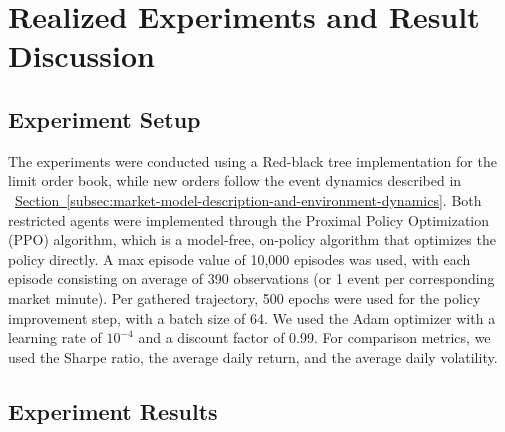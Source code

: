 \section{Realized Experiments and Result Discussion}
\label{sec:realized-experiments-and-result-discussion}

\subsection{Experiment Setup}
\label{subsec:experiment-setup}

The experiments were conducted using a Red-black tree implementation for the limit order book, while new orders follow the event dynamics described in
~\hyperref[subsec:market-model-description-and-environment-dynamics]{Section~\ref*{subsec:market-model-description-and-environment-dynamics}}.
Both restricted agents were implemented through the Proximal Policy Optimization (PPO) algorithm, which is a model-free, on-policy algorithm that optimizes the policy directly.
A max episode value of 10,000 episodes was used, with each episode consisting on average of 390 observations (or 1 event per corresponding market minute).
Per gathered trajectory, 500 epochs were used for the policy improvement step, with a batch size of 64.
We used the Adam optimizer with a learning rate of $10^{-4}$ and a discount factor of 0.99.
For comparison metrics, we used the Sharpe ratio, the average daily return, and the average daily volatility.

\subsection{Experiment Results}
\label{subsec:experiment-results}



